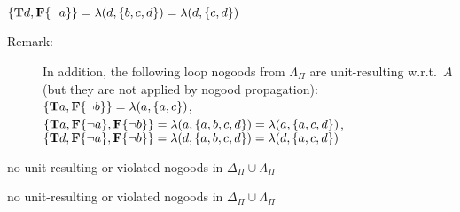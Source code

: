 \begin{Loesung}
{\begin{UList}
      $\{\mathbf{T}d,\mathbf{F}\{{\neg{a}}\}\}=\lambda(d,\{b,c,d\})=\lambda(d,\{c,d\})$
      \begin{description}
      \item[Remark:]
      In addition, the following loop nogoods from $\Lambda_\Pi$ are unit-resulting w.r.t.~$A$
      (but they are not applied by nogood propagation):\newline
      $\{\mathbf{T}a,\mathbf{F}\{{\neg{b}}\}\}=\lambda(a,\{a,c\})$,\newline
      $\{\mathbf{T}a,\mathbf{F}\{{\neg{a}}\},\mathbf{F}\{{\neg{b}}\}\}=\lambda(a,\{a,b,c,d\})=\lambda(a,\{a,c,d\})$,\newline
      $\{\mathbf{T}d,\mathbf{F}\{{\neg{a}}\},\mathbf{F}\{{\neg{b}}\}\}=\lambda(d,\{a,b,c,d\})=\lambda(d,\{a,c,d\})$
      \end{description}
\item no unit-resulting or violated nogoods in $\Delta_\Pi\cup\Lambda_\Pi$
\item no unit-resulting or violated nogoods in $\Delta_\Pi\cup\Lambda_\Pi$
\end{UList}}
\end{Loesung}

